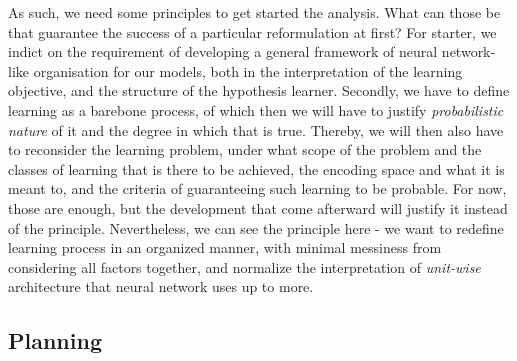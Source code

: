 \documentclass[10pt]{article}
\begin{document}
As such, we need some principles to get started the analysis. What can those be that guarantee the success of a particular reformulation at first? For starter, we indict on the requirement of developing a general framework of neural network-like organisation for our models, both in the interpretation of the learning objective, and the structure of the hypothesis learner. Secondly, we have to define learning as a barebone process, of which then we will have to justify \textit{probabilistic nature} of it and the degree in which that is true. Thereby, we will then also have to reconsider the learning problem, under what scope of the problem and the classes of learning that is there to be achieved, the encoding space and what it is meant to, and the criteria of guaranteeing such learning to be probable. For now, those are enough, but the development that come afterward will justify it instead of the principle. 
Nevertheless, we can see the principle here - we want to redefine learning process in an organized manner, with minimal messiness from considering all factors together, and normalize the interpretation of \textit{unit-wise} architecture that neural network uses up to more. 

\subsection{Planning}
\end{document}
